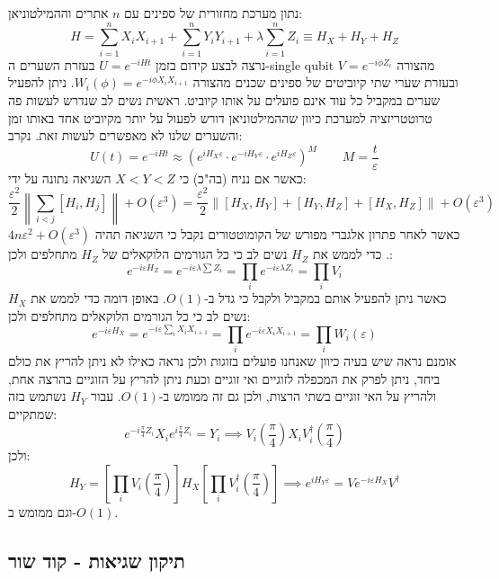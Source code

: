 \documentclass{tstextbook}
\begin{document}
\begin{example}
נתון מערכת מחזורית של ספינים עם \(n\) אתרים וההמילטוניאן:
$$H=\sum_{i=1}^{n}X_{i}X_{i+1}+\sum_{i=1}^{n}Y_{i}Y_{i+1}+\lambda\sum_{i=1}^{n}Z_{i}\equiv H_{X}+H_{Y}+H_{Z}$$
נרצה לבצע קידום בזמן \(U=e^{ -iHt }\) בעזרת השערים ה-single qubit מהצורה \(V=e^{ -i\phi Z_{i} }\) ובעזרת שערי שתי קיוביטים של ספינים שכנים מהצורה \(W_{i}\left( \phi \right)=e^{ -i\phi X_{i}X_{i+1} }\). ניתן להפעיל שערים במקביל כל עוד אינם פועלים על אותו קיוביט. ראשית נשים לב שנדרש לעשות פה טרוטטריזציה למערכת כיוון שההמילטוניאן דורש לפעול על יותר מקיוביט אחד באותו זמן והשערים שלנו לא מאפשרים לעשות זאת. נקרב:
$$U(t)=e^{ -iHt }\approx \left( e^{ iH_{X}\varepsilon }\cdot e^{ -iH_{Y} \varepsilon}\cdot e^{ iH_{Z}\varepsilon } \right)^{M}\qquad M=\frac{t}{\varepsilon}$$
כאשר אם נניח (בה"כ) כי \(X<Y<Z\) השגיאה נתונה על ידי:
$$\frac{\varepsilon^{2}}{2}\left\lVert  \sum_{i<j}[H_{i},H_{j}]  \right\rVert +O\left( \varepsilon^{3} \right)=\frac{\varepsilon^{2}}{2}\lVert [H_{X},H_{Y}]+[H_{Y},H_{Z}]+[H_{X},H_{Z}] \rVert +O\left( \varepsilon^{3} \right)$$
כאשר לאחר פתרון אלגברי מפורש של הקומוטטורים נקבל כי השגיאה תהיה \(4n\varepsilon^{2}+O\left( \varepsilon^{3} \right)\).
כדי לממש את \(H_{Z}\) נשים לב כי כל הגורמים הלוקאלים של \(H_{Z}\) מתחלפים ולכן:
$$e^{ -i\varepsilon H_{Z} }=e^{ -i\varepsilon \lambda \sum Z_{i} }=\prod_{i}e^{ -i\varepsilon \lambda Z_{i} }=\prod_{i}V_{i}$$
כאשר ניתן להפעיל אותם במקביל ולקבל כי גדל ב-\(O(1)\). באופן דומה כדי לממש את \(H_{X}\) נשים לב כי כל הגורמים הלוקאלים מתחלפים ולכן:
$$e^{ -i\varepsilon H_{X} }=e^{ -i\varepsilon \sum_{i}X_{i}X_{i+1}}=\prod_{i}e^{ -i\varepsilon X_{i}X_{i+1} }=\prod_{i} W_{i}\left( \varepsilon \right)$$
אומנם נראה שיש בעיה כיוון שאנחנו פועלים בזוגות ולכן נראה כאילו לא ניתן להריץ את כולם ביחד, ניתן לפרק את המכפלה לזוגיים ואי זוגיים וכעת ניתן להריץ על הזוגיים בהרצה אחת, ולהריץ על האי זוגיים בשתי הרצות, ולכן גם זה ממומש ב-\(O(1)\). עבור \(H_{Y}\) נשתמש בזה שמתקיים:
$$e^{ -i\frac{\pi}{4} Z_{i} }X_{i}e^{ i\frac{\pi}{4} Z_{i} }=Y_{i}\implies V_{i}\left( \frac{\pi}{4} \right)X_{i}V_{i}^{\dagger}\left( \frac{\pi}{4} \right)$$
ולכן:
$$H_{Y}=\left[ \prod_{i}V_{i}\left( \frac{\pi}{4} \right) \right]H_{X}\left[ \prod_{i}V_{i}^{\dagger}\left( \frac{\pi}{4} \right) \right]\implies e^{ iH_{Y}\varepsilon }=Ve^{ -i\varepsilon H_{X} }V^{\dagger}$$
וגם ממומש ב-\(O(1)\).

\end{example}
\subsection{תיקון שגיאות - קוד שור}
\end{document}
